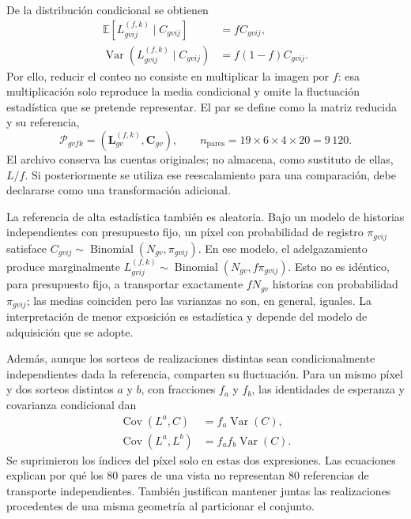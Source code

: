 \documentclass[11pt,a4paper]{article}
\newcommand{\E}{\mathbb{E}}
\newcommand{\Var}{\operatorname{Var}}
\newcommand{\Cov}{\operatorname{Cov}}
\begin{document}
De la distribución condicional se obtienen
\begin{align}
 \E[L^{(f,k)}_{gvij}\mid C_{gvij}]&=fC_{gvij},\\
 \Var(L^{(f,k)}_{gvij}\mid C_{gvij})&=f(1-f)C_{gvij}.
 \label{eq:momentos}
\end{align}
Por ello, reducir el conteo no consiste en multiplicar la imagen por $f$: esa multiplicación solo reproduce la media condicional y omite la fluctuación estadística que se pretende representar. El par se define como la matriz reducida y su referencia,
\begin{equation}
 \mathcal P_{gvfk}=\left(\boldsymbol L^{(f,k)}_{gv},\boldsymbol C_{gv}\right),
 \qquad n_{\mathrm{pares}}=19\times6\times4\times20=9\,120.
\end{equation}
El archivo conserva las cuentas originales; no almacena, como sustituto de ellas, $L/f$. Si posteriormente se utiliza ese reescalamiento para una comparación, debe declararse como una transformación adicional.

La referencia de alta estadística también es aleatoria. Bajo un modelo de historias independientes con presupuesto fijo, un píxel con probabilidad de registro $\pi_{gvij}$ satisface $C_{gvij}\sim\operatorname{Binomial}(N_{gv},\pi_{gvij})$. En ese modelo, el adelgazamiento produce marginalmente $L^{(f,k)}_{gvij}\sim\operatorname{Binomial}(N_{gv},f\pi_{gvij})$. Esto no es idéntico, para presupuesto fijo, a transportar exactamente $fN_{gv}$ historias con probabilidad $\pi_{gvij}$; las medias coinciden pero las varianzas no son, en general, iguales. La interpretación de menor exposición es estadística y depende del modelo de adquisición que se adopte.

Además, aunque los sorteos de realizaciones distintas sean condicionalmente independientes dada la referencia, comparten su fluctuación. Para un mismo píxel y dos sorteos distintos $a$ y $b$, con fracciones $f_a$ y $f_b$, las identidades de esperanza y covarianza condicional dan
\begin{align}
 \Cov(L^{a},C)&=f_a\Var(C),\\
 \Cov(L^{a},L^{b})&=f_af_b\Var(C).
 \label{eq:dependencia}
\end{align}
Se suprimieron los índices del píxel solo en estas dos expresiones. Las ecuaciones explican por qué los 80 pares de una vista no representan 80 referencias de transporte independientes. También justifican mantener juntas las realizaciones procedentes de una misma geometría al particionar el conjunto.
\end{document}
